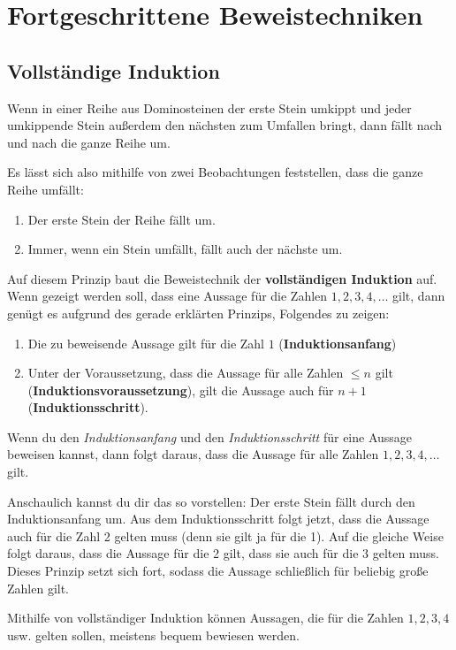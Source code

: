 \documentclass[../../main.tex]{subfiles}
\begin{document}
    \section*{Fortgeschrittene Beweistechniken}
    \label{advanced-proofs}
    
    \subsection*{Vollständige Induktion}
    Wenn in einer Reihe aus Dominosteinen der erste Stein umkippt und jeder umkippende Stein außerdem den nächsten zum Umfallen bringt, dann fällt nach und nach die ganze Reihe um.

    Es lässt sich also mithilfe von zwei Beobachtungen feststellen, dass die ganze Reihe umfällt:
    \begin{enumerate}
        \item Der erste Stein der Reihe fällt um.
        \item Immer, wenn ein Stein umfällt, fällt auch der nächste um.
    \end{enumerate}
    Auf diesem Prinzip baut die Beweistechnik der \textbf{vollständigen Induktion} auf. Wenn gezeigt werden soll, dass eine Aussage für die Zahlen $1,2,3,4,\dots$ gilt, dann genügt es aufgrund des gerade erklärten Prinzips, Folgendes zu zeigen:
    \begin{enumerate}
        \item Die zu beweisende Aussage gilt für die Zahl $1$ (\textbf{Induktionsanfang})
        \item Unter der Voraussetzung, dass die Aussage für alle Zahlen $\leq n$ gilt (\textbf{In\-duk\-tions\-voraus\-setzung}), gilt die Aussage auch für $n+1$ (\textbf{Induktionsschritt}).
    \end{enumerate}
    Wenn du den \emph{Induktionsanfang} und den \emph{Induktionsschritt} für eine Aussage beweisen kannst, dann folgt daraus, dass die Aussage für alle Zahlen $1,2,3,4,\dots$ gilt.
    
    Anschaulich kannst du dir das so vorstellen: Der erste Stein fällt durch den Induktionsanfang um. Aus dem Induktionsschritt folgt jetzt, dass die Aussage auch für die Zahl 2 gelten muss (denn sie gilt ja für die 1). Auf die gleiche Weise folgt daraus, dass die Aussage für die 2 gilt, dass sie auch für die 3 gelten muss. Dieses Prinzip setzt sich fort, sodass die Aussage schließlich für beliebig große Zahlen gilt.
    
    Mithilfe von vollständiger Induktion können Aussagen, die für die Zahlen $1,2,3,4$ usw. gelten sollen, meistens bequem bewiesen werden.
\end{document}
